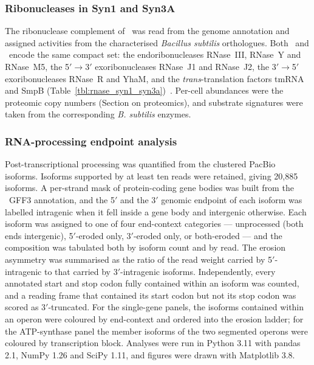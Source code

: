 \subsubsection{Ribonucleases in Syn1 and Syn3A}

The ribonuclease complement of \syn~was read from the genome annotation and assigned activities from the characterised \textit{Bacillus subtilis} orthologues.
Both \syn~and \syna~encode the same compact set: the endoribonucleases RNase~III, RNase~Y and RNase~M5, the 5$'\rightarrow$3$'$ exoribonucleases RNase~J1 and RNase~J2, the 3$'\rightarrow$5$'$ exoribonucleases RNase~R and YhaM, and the \textit{trans}-translation factors tmRNA and SmpB (Table~\ref{tbl:rnase_syn1_syn3a})~\cite{durand_rnases_2018, redko_minimal_2013}.
Per-cell abundances were the proteomic copy numbers (Section on proteomics), and substrate signatures were taken from the corresponding \textit{B. subtilis} enzymes.

\subsubsection{RNA-processing endpoint analysis}

Post-transcriptional processing was quantified from the clustered PacBio isoforms.
Isoforms supported by at least ten reads were retained, giving 20{,}885 isoforms.
A per-strand mask of protein-coding gene bodies was built from the \syn~GFF3 annotation, and the 5$'$ and the 3$'$ genomic endpoint of each isoform was labelled intragenic when it fell inside a gene body and intergenic otherwise.
Each isoform was assigned to one of four end-context categories --- unprocessed (both ends intergenic), 5$'$-eroded only, 3$'$-eroded only, or both-eroded --- and the composition was tabulated both by isoform count and by read.
The erosion asymmetry was summarised as the ratio of the read weight carried by 5$'$-intragenic to that carried by 3$'$-intragenic isoforms.
Independently, every annotated start and stop codon fully contained within an isoform was counted, and a reading frame that contained its start codon but not its stop codon was scored as 3$'$-truncated.
For the single-gene panels, the isoforms contained within an operon were coloured by end-context and ordered into the erosion ladder; for the ATP-synthase panel the member isoforms of the two segmented operons were coloured by transcription block.
Analyses were run in Python 3.11 with pandas 2.1, NumPy 1.26 and SciPy 1.11, and figures were drawn with Matplotlib 3.8.

